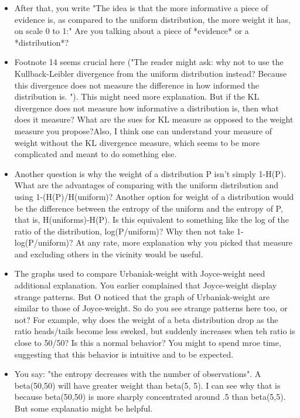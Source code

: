 \documentclass[
  10pt,
  dvipsnames,enabledeprecatedfontcommands]{scrartcl}
\begin{document}
\begin{itemize}
\item After that, you write "The idea is that the more informative a piece of evidence is, as compared to the uniform distribution, the more weight it has, on scale 0 to 1:" Are you talking about a piece of *evidence* or a *distribution*? 

\item Footnote 14 seems crucial here ("The reader might ask: why not to use the Kullback-Leibler divergence from the uniform distribution instead? Because this divergence does not measure the difference in how informed the distribution is. "). This might need more explanation. But if the KL divergence does not measure how informative a distribution is, then what does it measure? What are the sues for KL measure as opposed to the weight measure you propose?Also, I think one can understand your measure of weight without the KL divergence measure, which seems to be more complicated and meant to do something else. 

\item Another question is why the weight of a distribution P isn't simply 1-H(P). What are the advantages of comparing with the uniform distribution and using 1-(H(P)/H(uniform)? Another option for weight of a distribution would be the difference between the entropy of the uniform and the entropy of P, that is, H(uniforms)-H(P). Is this equivalent to something like the log of the ratio of the distribution, log(P/uniform)? Why then not take 1-log(P/uniform)? At any rate, more explanation why you picked that measure and excluding others in the vicinity would be useful.

\item The graphs used to compare Urbaniak-weight with Joyce-weight need additional explanation. You earlier complained that Joyce-weight display strange patterns. But O noticed that the graph of Urbaniak-weight are similar to those of Joyce-weight. So do you see strange patterns here too, or not? For example, why does the weight of a beta distribution drop as the ratio heads/tails become less sweked, but suddenly increases when teh ratio is close to 50/50? Is this a normal behavior? You might to spend mroe time, suggesting that this behavior is intuitive and to be expected. 

\item You say: "the entropy decreases with the number of observations". A beta(50,50) will have greater weight than beta(5, 5). I can see why that is because beta(50,50) is more sharply concentrated around .5 than beta(5,5). But some explanatio might be helpful.


\end{itemize}
\end{document}
